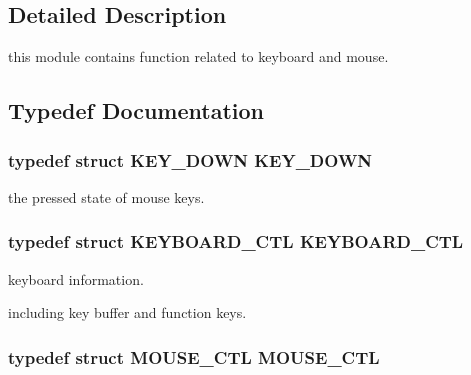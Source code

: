 \subsection{Detailed Description}
this module contains function related to keyboard and mouse. 



\subsection{Typedef Documentation}
\hypertarget{group__keyboard__mousse_gac3cb28f52c35738da3198d6e6af3103d}{}
\subsubsection[{K\+E\+Y\+\_\+\+D\+O\+W\+N}]{\setlength{\rightskip}{0pt plus 5cm}typedef struct {\bf K\+E\+Y\+\_\+\+D\+O\+W\+N} {\bf K\+E\+Y\+\_\+\+D\+O\+W\+N}}\label{group__keyboard__mousse_gac3cb28f52c35738da3198d6e6af3103d}


the pressed state of mouse keys. 

\hypertarget{group__keyboard__mousse_gabf8195274ea750bccb5b26a7f706151d}{}
\subsubsection[{K\+E\+Y\+B\+O\+A\+R\+D\+\_\+\+C\+T\+L}]{\setlength{\rightskip}{0pt plus 5cm}typedef struct {\bf K\+E\+Y\+B\+O\+A\+R\+D\+\_\+\+C\+T\+L} {\bf K\+E\+Y\+B\+O\+A\+R\+D\+\_\+\+C\+T\+L}}\label{group__keyboard__mousse_gabf8195274ea750bccb5b26a7f706151d}


keyboard information. 

including key buffer and function keys. \hypertarget{group__keyboard__mousse_gaea67189c062822a09168edbef65e1fe7}{}
\subsubsection[{M\+O\+U\+S\+E\+\_\+\+C\+T\+L}]{\setlength{\rightskip}{0pt plus 5cm}typedef struct {\bf M\+O\+U\+S\+E\+\_\+\+C\+T\+L} {\bf M\+O\+U\+S\+E\+\_\+\+C\+T\+L}}\label{group__keyboard__mousse_gaea67189c062822a09168edbef65e1fe7}


